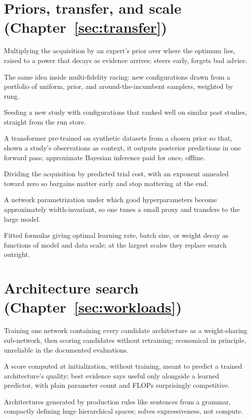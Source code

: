 \section*{Priors, transfer, and scale (Chapter~\ref{sec:transfer})}

\begin{description}[leftmargin=1.5em, itemsep=1pt, font=\normalfont\bfseries]
\item[$\pi$BO] Multiplying the acquisition by an expert's prior over
where the optimum lies, raised to a power that decays as evidence
arrives; steers early, forgets bad advice.
\item[PriorBand] The same idea inside multi-fidelity racing: new
configurations drawn from a portfolio of uniform, prior, and
around-the-incumbent samplers, weighted by rung.
\item[warm start] Seeding a new study with configurations that ranked
well on similar past studies, straight from the run store.
\item[prior-fitted network (PFN)] A transformer pre-trained on
synthetic datasets from a chosen prior so that, shown a study's
observations as context, it outputs posterior predictions in one
forward pass; approximate Bayesian inference paid for once, offline.
\item[EI-per-cost / cost cooling] Dividing the acquisition by
predicted trial cost, with an exponent annealed toward zero so
bargains matter early and stop mattering at the end.
\item[$\mu$P / $\mu$Transfer] A network parametrization under which
good hyperparameters become approximately width-invariant, so one
tunes a small proxy and transfers to the large model.
\item[scaling laws (for tuning)] Fitted formulas giving optimal
learning rate, batch size, or weight decay as functions of model and
data scale; at the largest scales they replace search outright.
\end{description}

\section*{Architecture search (Chapter~\ref{sec:workloads})}

\begin{description}[leftmargin=1.5em, itemsep=1pt, font=\normalfont\bfseries]
\item[one-shot NAS / supernet] Training one network containing every
candidate architecture as a weight-sharing sub-network, then scoring
candidates without retraining; economical in principle, unreliable in
the documented evaluations.
\item[zero-cost proxy] A score computed at initialization, without
training, meant to predict a trained architecture's quality; best
evidence says useful only alongside a learned predictor, with plain
parameter count and FLOPs surprisingly competitive.
\item[grammar-based search space] Architectures generated by
production rules like sentences from a grammar, compactly defining
huge hierarchical spaces; solves expressiveness, not compute.
\end{description}

